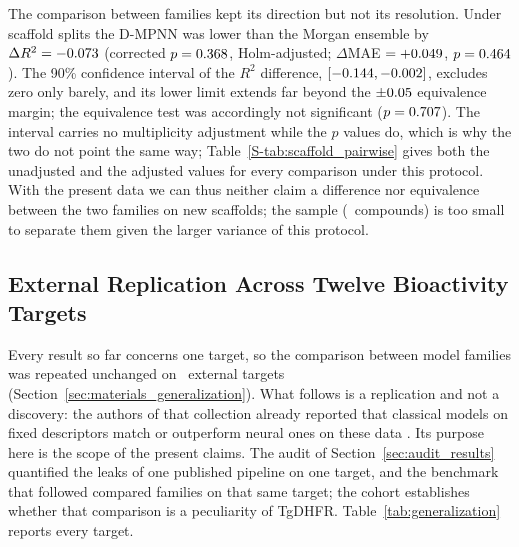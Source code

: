 The comparison between families kept its direction but not its resolution. Under scaffold splits the D-MPNN was lower than the Morgan ensemble by $\Delta R^2 = -0.073$ (corrected $p = 0.368$, Holm-adjusted; $\Delta$MAE $= +0.049$, $p = 0.464$). The 90\% confidence interval of the $R^2$ difference, $[-0.144, -0.002]$, excludes zero only barely, and its lower limit extends far beyond the $\pm0.05$ equivalence margin; the equivalence test was accordingly not significant ($p = 0.707$). The interval carries no multiplicity adjustment while the $p$ values do, which is why the two do not point the same way; Table~\ref{S-tab:scaffold_pairwise} gives both the unadjusted and the adjusted values for every comparison under this protocol. With the present data we can thus neither claim a difference nor equivalence between the two families on new scaffolds; the sample (\NCompounds\ compounds) is too small to separate them given the larger variance of this protocol.

\subsection{External Replication Across Twelve Bioactivity Targets}
\label{sec:gen_results}

Every result so far concerns one target, so the comparison between model families was repeated unchanged on
\GenNTargets\ external targets (Section~\ref{sec:materials_generalization}). What follows is a replication and not a
discovery: the authors of that collection already reported that classical models on fixed descriptors match or
outperform neural ones on these data \citep{vantilborg2022}. Its purpose here is the scope of the present claims. The
audit of Section~\ref{sec:audit_results} quantified the leaks of one published pipeline on one target, and the
benchmark that followed compared families on that same target; the cohort establishes whether that comparison is a
peculiarity of TgDHFR. Table~\ref{tab:generalization} reports every target.

\begin{table}[htbp]
	\centering
	\caption{The classical ensemble against the default D-MPNN on \GenNTargets\ external targets. Cliffs is the percentage of compounds the collection flags as activity cliffs. Every $\Delta R^2$ is the classical value minus the neural one, so a positive number favours the classical model. The cross-validated columns are means over \GenTotalOuterFolds\ outer folds shared by both families within each target, with the Holm-adjusted $p$ of the corrected paired $t$-test; the last two columns are differences on the partition published with the collection, scored on the whole test part and on its activity cliffs alone.}
	\label{tab:generalization}
\end{table}

